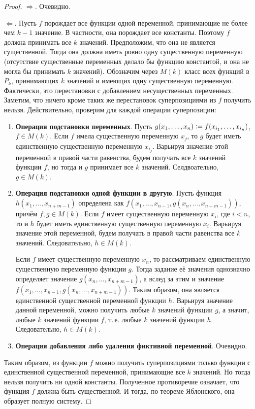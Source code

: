 \begin{proof}
    $\Rightarrow$. Очевидно.
    
    $\Leftarrow$. Пусть $f$ порождает все функции одной переменной, принимающие не более чем $k - 1$ значение. В частности, она порождает все константы. Поэтому $f$ должна принимать все $k$ значений. Предположим, что она не является существенной. Тогда она должна иметь ровно одну существенную переменную (отсутствие существенные переменных делало бы функцию константой, и она не могла бы принимать $k$ значений). Обозначим через $M(k)$ класс всех функций в $P_k$, принимающих $k$ значений и имеющих одну существенную переменную. Фактически, это перестановки с добавлением несущественных переменных. Заметим, что ничего кроме таких же перестановок суперпозициями из $f$ получить нельзя. Действительно, проверим для каждой операции суперпозиции:

    \begin{enumerate}
        \item \textbf{Операция подстановки переменных}. Пусть $g(x_1, \ldots, x_n) \vcentcolon = f(x_{i_1}, \ldots, x_{i_n})$, $f \in M(k)$. Если $f$ имела существенную переменную $x_j$, то $g$ будет иметь единственную существенную переменную $x_{i_j}$. Варьируя значение этой переменной в правой части равенства, будем получать все $k$ значений функции $f$, но тогда и $g$ принимает все $k$ значений. Селдвоательно, $g \in M(k)$.
        \item \textbf{Операция подстановки одной функции в другую}. Пусть функция $h(x_1, \ldots, x_{n + m - 1})$ определена как $f(x_1, \ldots, x_{n - 1}, g(x_n, \ldots, x_{n + m - 1}))$, причём $f, g \in M(k)$. Если $f$ имеет существенную переменную $x_i$, где $i < n$, то и $h$ будет иметь единственную существенную переменную $x_i$. Варьируя значение этой переменной, будем получать в правой части равенства все $k$ значений. Следовательно, $h \in M(k)$.

            Если $f$ имеет существенную переменную $x_n$, то рассматриваем единственную существенную переменную функции $g$. Тогда задание её значения однозначно определяет значение $g(x_n, \ldots, x_{n + m - 1})$, а вслед за этим и значение $f(x_1, \ldots, x_{n - 1}, g(x_n, \ldots, x_{n + m - 1}))$. Таким образом, она является единственной существенной переменной функции $h$. Варьируя значение данной переменной, можно получить любые $k$ значений функции $g$, а значит, любые $k$ значений функции $f$, т.\,е. любые $k$ значений функции $h$. Следовательно, $h \in M(k)$.
        \item \textbf{Операция добавления либо удаления фиктивной переменной}. Очевидно.
    \end{enumerate}

    Таким образом, из функции $f$ можно получить суперпозициями только функции с единственной существенной переменной, принимающие все $k$ значений. Но тогда нельзя получить ни одной константы. Полученное противоречие означает, что функция $f$ должна быть существенной. И тогда, по теореме Яблонского, она образует полную систему.
\end{proof}

